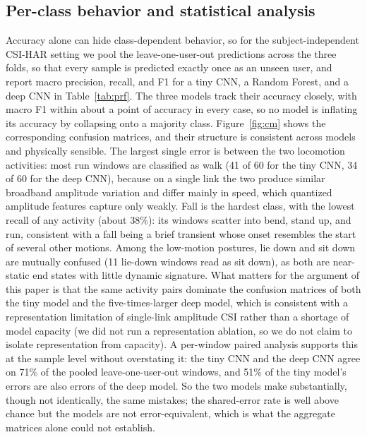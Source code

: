 \documentclass{ieeeaccess}
\begin{document}
\subsection{Per-class behavior and statistical analysis}
\label{sec:results-perclass}
Accuracy alone can hide class-dependent behavior, so for the subject-independent CSI-HAR setting we pool the leave-one-user-out predictions across the three folds, so that every sample is predicted exactly once as an unseen user, and report macro precision, recall, and F1 for a tiny CNN, a Random Forest, and a deep CNN in Table~\ref{tab:prf}. The three models track their accuracy closely, with macro F1 within about a point of accuracy in every case, so no model is inflating its accuracy by collapsing onto a majority class. Figure~\ref{fig:cm} shows the corresponding confusion matrices, and their structure is consistent across models and physically sensible. The largest single error is between the two locomotion activities: most run windows are classified as walk (41 of 60 for the tiny CNN, 34 of 60 for the deep CNN), because on a single link the two produce similar broadband amplitude variation and differ mainly in speed, which quantized amplitude features capture only weakly. Fall is the hardest class, with the lowest recall of any activity (about 38\%): its windows scatter into bend, stand up, and run, consistent with a fall being a brief transient whose onset resembles the start of several other motions. Among the low-motion postures, lie down and sit down are mutually confused (11 lie-down windows read as sit down), as both are near-static end states with little dynamic signature. What matters for the argument of this paper is that the same activity pairs dominate the confusion matrices of both the tiny model and the five-times-larger deep model, which is consistent with a representation limitation of single-link amplitude CSI rather than a shortage of model capacity (we did not run a representation ablation, so we do not claim to isolate representation from capacity). A per-window paired analysis supports this at the sample level without overstating it: the tiny CNN and the deep CNN agree on 71\% of the pooled leave-one-user-out windows, and 51\% of the tiny model's errors are also errors of the deep model. So the two models make substantially, though not identically, the same mistakes; the shared-error rate is well above chance but the models are not error-equivalent, which is what the aggregate matrices alone could not establish.
\end{document}
